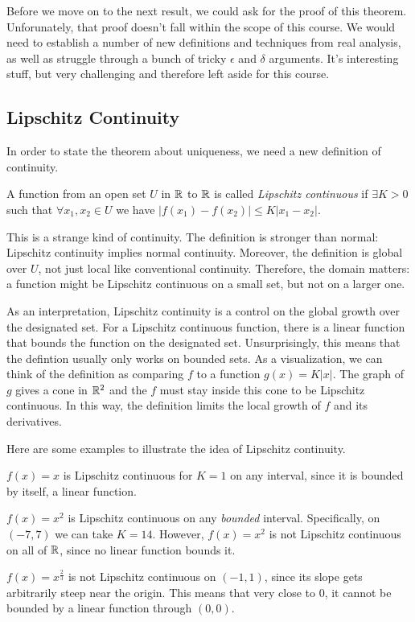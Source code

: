 \documentclass[fleqn,letterpaper]{report}
\begin{document}
Before we move on to the next result, we could ask for the
proof of this theorem. Unforunately, that proof doesn't fall
within the scope of this course. We would need to establish a
number of new definitions and techniques from real analysis,
as well as struggle through a bunch of tricky $\epsilon$ and
$\delta$ arguments. It's interesting stuff, but very
challenging and therefore left aside for this course.

\subsection{Lipschitz Continuity}
\label{lipschitz}

In order to state the theorem about uniqueness, we need a new
definition of continuity. 

\begin{defn}
A function from an open set $U$ in
$\mathbb{R}$ to $\mathbb{R}$ is called \emph{Lipschitz continuous} if
$\exists K > 0$ such that $\forall x_1,x_2 \in U$ we have
$|f(x_1) - f(x_2)| \leq K|x_1-x_2|$.
\end{defn}

This is a strange kind of continuity. The definition is
stronger than normal: Lipschitz continuity implies
normal continuity. Moreover, the definition is global over
$U$, not just local like conventional continuity. Therefore,
the domain matters: a function might be Lipschitz continuous
on a small set, but not on a larger one. 

As an interpretation, Lipschitz continuity is a control on the
global growth over the designated set. For a Lipschitz
continuous function, there is a linear function that bounds
the function on the designated set. Unsurprisingly, this means
that the defintion usually only works on bounded sets.
As a visualization, we can think of the definition as
comparing $f$ to a function $g(x) = K|x|$. The graph of $g$
gives a cone in $\mathbb{R}^2$ and the $f$ must stay inside this cone
to be Lipschitz continuous. In this way, the definition 
limits the local growth of $f$ and its derivatives.

\begin{example}
Here are some examples to illustrate the idea of Lipschitz
continuity.
\begin{smallitemize}
\item $f(x) = x$ is Lipschitz continuous for $K=1$ on any interval,
since it is bounded by itself, a linear function. 
\item $f(x) = x^2$ is Lipschitz continuous on any \emph{bounded}
interval. Specifically, on $(-7,7)$ we can take $K=14$.
However, $f(x) = x^2$ is not Lipschitz continuous on all of
$\mathbb{R}$, since no linear function bounds it. 
\item $f(x) = x^{\frac{2}{3}}$ is not Lipschitz continuous on
$(-1,1)$, since its slope gets arbitrarily steep near the
origin. This means that very close to $0$, it cannot be
bounded by a linear function through $(0,0)$. 
\end{smallitemize}
\end{example}
\end{document}
